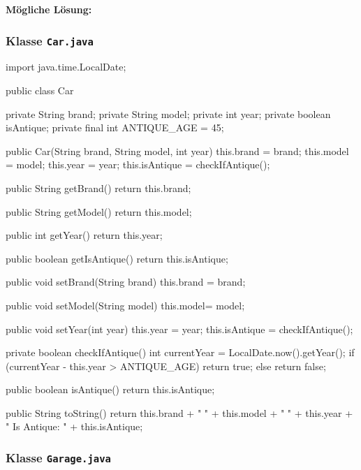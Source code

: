 \documentclass[a4paper,10pt, dvipsnames]{report}
\begin{document}
\textbf{Mögliche Lösung:}

\subsubsection{Klasse \texttt{Car.java}}

\begin{javacodebox}
import java.time.LocalDate;

public class Car {
    
    private String brand;
    private String model;
    private int year;
    private boolean isAntique;
    private final int ANTIQUE_AGE = 45;

    public Car(String brand, String model, int year) {
        this.brand = brand;
        this.model = model;
        this.year = year;
        this.isAntique = checkIfAntique();
    }

    public String getBrand() {
        return this.brand;
    }

    public String getModel() {
        return this.model;
    }

    public int getYear() {
        return this.year;
    }

    public boolean getIsAntique() {
        return this.isAntique;
    }

    public void setBrand(String brand) {
        this.brand = brand;
    }

    public void setModel(String model) {
        this.model= model;
    }

    public void setYear(int year) {
        this.year = year;
        this.isAntique = checkIfAntique();
    }

    private boolean checkIfAntique() {
        int currentYear = LocalDate.now().getYear();
        if (currentYear - this.year > ANTIQUE_AGE) {
            return true;
        } else {
            return false;
        }
    }

    public boolean isAntique() {
        return this.isAntique;
    }

    public String toString() {
        return this.brand + " " + this.model + " " + this.year + " Is Antique: " + this.isAntique;
    }
}
\end{javacodebox}

\subsubsection{Klasse \texttt{Garage.java}}
\end{document}
